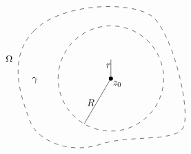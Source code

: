 \documentclass[12pt]{article}
\begin{document}
\begin{theorem}
\[\begin{tikzpicture}[x=0.75pt,y=0.75pt,yscale=-0.7,xscale=.7]
        \draw    (282.02,121.14) -- (282.02,158.43) ;
        \draw [shift={(282.02,158.43)}, rotate = 90] [color={rgb, 255:red, 0; green, 0; blue, 0 }  ][fill={rgb, 255:red, 0; green, 0; blue, 0 }  ][line width=0.75]      (0, 0) circle [x radius= 3.35, y radius= 3.35]   ;
        \draw  [dash pattern={on 4.5pt off 4.5pt}] (178.08,158.43) .. controls (178.08,101.02) and (224.62,54.49) .. (282.02,54.49) .. controls (339.42,54.49) and (385.95,101.02) .. (385.95,158.43) .. controls (385.95,215.83) and (339.42,262.36) .. (282.02,262.36) .. controls (224.62,262.36) and (178.08,215.83) .. (178.08,158.43) -- cycle ;
        \draw    (282.02,158.43) -- (229.26,248.39) ;
        \draw  [dash pattern={on 4.5pt off 4.5pt}] (129.26,65.39) .. controls (182.26,9.39) and (318.51,4.79) .. (361.26,34.39) .. controls (404,64) and (442.26,230.39) .. (423.26,257.39) .. controls (404.26,284.39) and (317.26,269.39) .. (261.26,288.39) .. controls (205.26,307.39) and (138.26,285.39) .. (122.26,241.39) .. controls (106.26,197.39) and (76.26,121.39) .. (129.26,65.39) -- cycle ;
        
        \draw (284.02,161.83) node [anchor=north west][inner sep=0.75pt]    {$z_{0}$};
        \draw (270.95,127.47) node [anchor=north west][inner sep=0.75pt]    {$r$};
        \draw (233.26,197.79) node [anchor=north west][inner sep=0.75pt]    {$R$};
        \draw (125,154.4) node [anchor=north west][inner sep=0.75pt]    {$\gamma $};
        \draw (73,111.4) node [anchor=north west][inner sep=0.75pt]    {$\Omega $};
        
        
        \end{tikzpicture}
        \]
\end{theorem}
\end{document}
